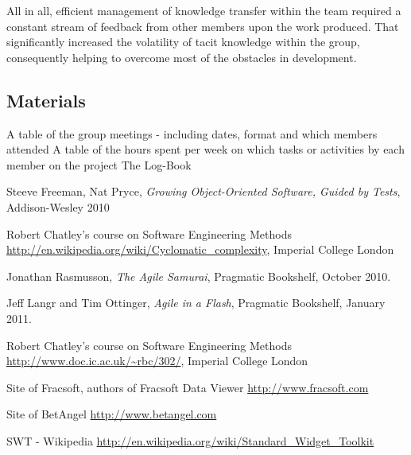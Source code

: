 \documentclass[10pt]{article}
\begin{document}
All in all, efficient management of knowledge transfer within the team required a constant stream of feedback from other members upon the work produced. That significantly increased the volatility of tacit knowledge within the group, consequently helping to overcome most of the obstacles in development.

\subsection{Materials}

A table of the group meetings - including dates, format and which members attended
A table of the hours spent per week on which tasks or activities by each member on the project
The Log-Book

\begin{thebibliography}{9}
  Steeve Freeman, Nat Pryce,
  \emph{Growing Object-Oriented Software, Guided by Tests}, Addison-Wesley 2010

  Robert Chatley's course on Software Engineering Methods
  \url{http://en.wikipedia.org/wiki/Cyclomatic_complexity},
  Imperial College London

  Jonathan Rasmusson,
  \emph{The Agile Samurai},
  Pragmatic Bookshelf,
  October 2010.

  Jeff Langr and Tim Ottinger,
  \emph{Agile in a Flash},
  Pragmatic Bookshelf, 
  January 2011.

  Robert Chatley's course on Software Engineering Methods
  \url{http://www.doc.ic.ac.uk/~rbc/302/},
  Imperial College London

  Site of Fracsoft, authors of Fracsoft Data Viewer
  \url{http://www.fracsoft.com}

  Site of BetAngel
  \url{http://www.betangel.com}
  
  SWT - Wikipedia
  \url{http://en.wikipedia.org/wiki/Standard_Widget_Toolkit}

\end{thebibliography}
\end{document}
